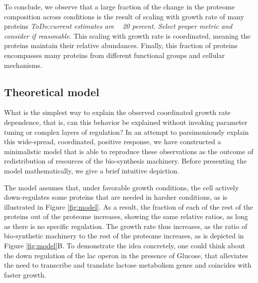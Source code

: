 \documentclass[notitlepage]{article}
\begin{document}
To conclude, we observe that a large fraction of the change in the proteome composition across conditions is the result of scaling with growth rate of many proteins \emph{ToDo:current estimates are ~ 20 percent. Select proper metric and consider if reasonable}.
This scaling with growth rate is coordinated, meaning the proteins maintain their relative abundances.
Finally, this fraction of proteins encompasses many proteins from different functional groups and cellular mechanisms.

\subsection{Theoretical model}
What is the simplest way to explain the observed coordinated growth rate dependence, that is, can this behavior be explained without invoking parameter tuning or complex layers of regulation?
In an attempt to parsimoniously explain this wide-spread, coordinated, positive response, we have constructed a minimalistic model that is able to reproduce these observations as the outcome of redistribution of resources of the bio-synthesis machinery.
Before presenting the model mathematically, we give a brief intuitive depiction.

The model assumes that, under favorable growth conditions, the cell actively down-regulates some proteins that are needed in harsher conditions, as is illustrated in Figure \ref{fig:model}.
As a result, the fraction of each of the rest of the proteins out of the proteome increases, showing the same relative ratios, as long as there is no specific regulation.
The growth rate thus increases, as the ratio of bio-synthetic machinery to the rest of the proteome increases, as is depicted in Figure \ref{fig:model}B.
To demonstrate the idea concretely, one could think about the down regulation of the lac operon in the presence of Glucose, that alleviates the need to transcribe and translate lactose metabolism genes and coincides with faster growth.
\end{document}

